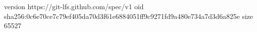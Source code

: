 version https://git-lfs.github.com/spec/v1
oid sha256:0c6e70ce7c79ef405da70d3f61e6884051ff9c9271fd9a480e734a7d3d6a825e
size 65527
